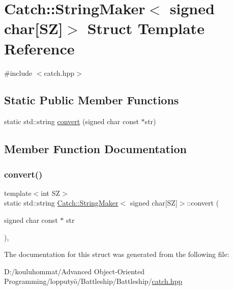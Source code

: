 \hypertarget{struct_catch_1_1_string_maker_3_01signed_01char[_s_z]_4}{}\section{Catch\+:\+:String\+Maker$<$ signed char\mbox{[}SZ\mbox{]}$>$ Struct Template Reference}
\label{struct_catch_1_1_string_maker_3_01signed_01char[_s_z]_4}


{\ttfamily \#include $<$catch.\+hpp$>$}

\subsection*{Static Public Member Functions}
\begin{DoxyCompactItemize}
\item 
static std\+::string \mbox{\hyperlink{struct_catch_1_1_string_maker_3_01signed_01char[_s_z]_4_a23ac689cc79dbcfe9b1765fe9e25690e}{convert}} (signed char const $\ast$str)
\end{DoxyCompactItemize}


\subsection{Member Function Documentation}
\mbox{\label{struct_catch_1_1_string_maker_3_01signed_01char[_s_z]_4_a23ac689cc79dbcfe9b1765fe9e25690e}} 
\subsubsection{\texorpdfstring{convert()}{convert()}}
{\footnotesize\ttfamily template$<$int SZ$>$ \\
static std\+::string \mbox{\hyperlink{struct_catch_1_1_string_maker}{Catch\+::\+String\+Maker}}$<$ signed char\mbox{[}SZ\mbox{]}$>$\+::convert (\begin{DoxyParamCaption}\item[{signed char const $\ast$}]{str }\end{DoxyParamCaption})\hspace{0.3cm}{\ttfamily [inline]}, {\ttfamily [static]}}



The documentation for this struct was generated from the following file\+:\begin{DoxyCompactItemize}
\item 
D\+:/kouluhommat/\+Advanced Object-\/\+Oriented Programming/lopputyö/\+Battleship/\+Battleship/\mbox{\hyperlink{catch_8hpp}{catch.\+hpp}}\end{DoxyCompactItemize}

